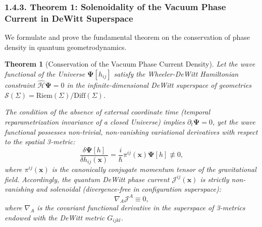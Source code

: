 \documentclass[11pt,a4paper]{article}
\newtheorem{theorem}{Theorem}[section]
\theoremstyle{definition}
\begin{document}
\subsubsection{1.4.3. Theorem 1: Solenoidality of the Vacuum Phase Current in DeWitt Superspace}\label{sec:1.4.3}

We formulate and prove the fundamental theorem on the conservation of phase density in quantum geometrodynamics.

\begin{theorem}[Conservation of the Vacuum Phase Current Density]\label{thm:1}
Let the wave functional of the Universe $\mathbf{\Psi}[h_{ij}]$ satisfy the Wheeler-DeWitt Hamiltonian constraint $\hat{\mathcal{H}}\mathbf{\Psi} = 0$ in the infinite-dimensional DeWitt superspace of geometries $\mathcal{S}(\Sigma) = \text{Riem}(\Sigma)/\text{Diff}(\Sigma)$.

The condition of the absence of external coordinate time (temporal reparametrization invariance of a closed Universe) implies $\partial_t \mathbf{\Psi} = 0$, yet the wave functional possesses non-trivial, non-vanishing variational derivatives with respect to the spatial 3-metric:
\begin{equation}\label{eq:1.91}\tag{1.91}
\frac{\delta \mathbf{\Psi}[h]}{\delta h_{ij}(\mathbf{x})} = \frac{i}{\hbar} \pi^{ij}(\mathbf{x}) \mathbf{\Psi}[h] \not\equiv 0,
\end{equation}
where $\pi^{ij}(\mathbf{x})$ is the canonically conjugate momentum tensor of the gravitational field. Accordingly, the quantum DeWitt phase current $\mathcal{J}^{ij}(\mathbf{x})$ is strictly non-vanishing and solenoidal (divergence-free in configuration superspace):
\begin{equation}\label{eq:1.92}\tag{1.92}
\nabla_A \mathcal{J}^A \equiv 0,
\end{equation}
where $\nabla_A$ is the covariant functional derivative in the superspace of 3-metrics endowed with the DeWitt metric $G_{ijkl}$.
\end{theorem}
\end{document}
